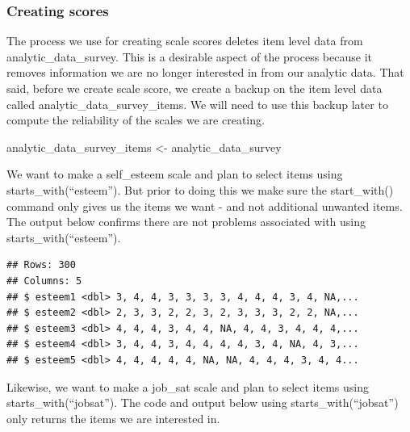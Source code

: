 \documentclass[
]{krantz}
\makeatletter
\newenvironment{Shaded}{\begin{snugshade}}{\end{snugshade}}
\newcommand{\KeywordTok}[1]{\textcolor[rgb]{0.27,0.27,0.27}{\textbf{#1}}}
\newcommand{\NormalTok}[1]{#1}
\newcommand{\OperatorTok}[1]{\textcolor[rgb]{0.43,0.43,0.43}{\textbf{#1}}}
\newcommand{\StringTok}[1]{\textcolor[rgb]{0.5,0.5,0.5}{#1}}
\newenvironment{kframe}{%
\medskip{}
\setlength{\fboxsep}{.8em}
 \def\at@end@of@kframe{}%
 \ifinner\ifhmode%
  \def\at@end@of@kframe{\end{minipage}}%
  \begin{minipage}{\columnwidth}%
 \fi\fi%
 \def\FrameCommand##1{\hskip\@totalleftmargin \hskip-\fboxsep
 \colorbox{shadecolor}{##1}\hskip-\fboxsep
     \hskip-\linewidth \hskip-\@totalleftmargin \hskip\columnwidth}%
 \MakeFramed {\advance\hsize-\width
   \@totalleftmargin\z@ \linewidth\hsize
   \@setminipage}}%
 {\par\unskip\endMakeFramed%
 \at@end@of@kframe}
\renewenvironment{Shaded}{\begin{kframe}}{\end{kframe}}
\makeatother
\begin{document}
\hypertarget{creating-scores}{%
\subsubsection{Creating scores}\label{creating-scores}}

The process we use for creating scale scores deletes item level data from analytic\_data\_survey. This is a desirable aspect of the process because it removes information we are no longer interested in from our analytic data. That said, before we create scale score, we create a backup on the item level data called analytic\_data\_survey\_items. We will need to use this backup later to compute the reliability of the scales we are creating.

\begin{Shaded}
\begin{Highlighting}[]
\NormalTok{analytic_data_survey_items <-}\StringTok{ }\NormalTok{analytic_data_survey}
\end{Highlighting}
\end{Shaded}

We want to make a self\_esteem scale and plan to select items using starts\_with(``esteem''). But prior to doing this we make sure the start\_with() command only gives us the items we want - and not additional unwanted items. The output below confirms there are not problems associated with using starts\_with(``esteem'').

\begin{Shaded}
\end{Shaded}

\begin{verbatim}
## Rows: 300
## Columns: 5
## $ esteem1 <dbl> 3, 4, 4, 3, 3, 3, 3, 4, 4, 4, 3, 4, NA,...
## $ esteem2 <dbl> 2, 3, 3, 2, 2, 3, 2, 3, 3, 3, 2, 2, NA,...
## $ esteem3 <dbl> 4, 4, 4, 3, 4, 4, NA, 4, 4, 3, 4, 4, 4,...
## $ esteem4 <dbl> 3, 4, 4, 3, 4, 4, 4, 4, 3, 4, NA, 4, 3,...
## $ esteem5 <dbl> 4, 4, 4, 4, 4, NA, NA, 4, 4, 4, 3, 4, 4...
\end{verbatim}

Likewise, we want to make a job\_sat scale and plan to select items using starts\_with(``jobsat''). The code and output below using starts\_with(``jobsat'') only returns the items we are interested in.
\end{document}
